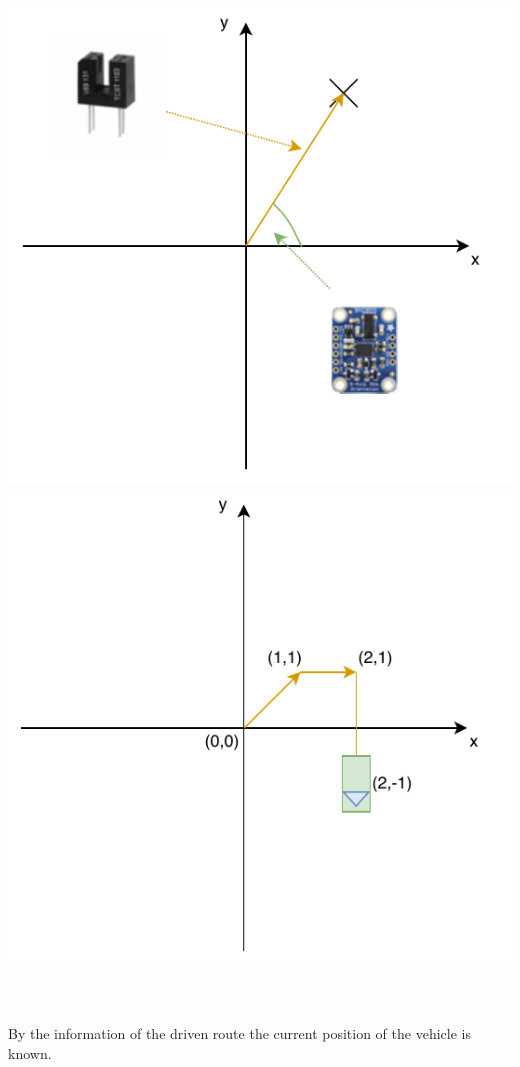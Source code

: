 \begin{minipage}{\textwidth}
	\centering
	\includegraphics[scale=0.6]{sources/mapping/orientation_distance.pdf}
	\includegraphics[scale=0.6]{sources/mapping/route.pdf}
\end{minipage}
\\
\\
By the information of the driven route the current position of the vehicle is known.




